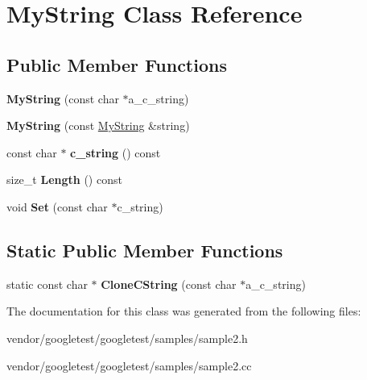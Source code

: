 \hypertarget{class_my_string}{}\section{My\+String Class Reference}
\label{class_my_string}
\subsection*{Public Member Functions}
\begin{DoxyCompactItemize}
\item 
\mbox{\label{class_my_string_a28134eb91b6698f46b12accefa157d0f}} 
{\bfseries My\+String} (const char $\ast$a\+\_\+c\+\_\+string)
\item 
\mbox{\label{class_my_string_ae24c7cf89a58dd2287303df2ac054c66}} 
{\bfseries My\+String} (const \hyperlink{class_my_string}{My\+String} \&string)
\item 
\mbox{\label{class_my_string_aff2af0cf30db39fe24a235670ee6ff25}} 
const char $\ast$ {\bfseries c\+\_\+string} () const
\item 
\mbox{\label{class_my_string_a4eb168b1ec401a732b3859abe004d648}} 
size\+\_\+t {\bfseries Length} () const
\item 
\mbox{\label{class_my_string_a521c4cd7eccac6ce554d8a51505e4970}} 
void {\bfseries Set} (const char $\ast$c\+\_\+string)
\end{DoxyCompactItemize}
\subsection*{Static Public Member Functions}
\begin{DoxyCompactItemize}
\item 
\mbox{\label{class_my_string_a40753dcfa3314a8993f32bdd75d67ce2}} 
static const char $\ast$ {\bfseries Clone\+C\+String} (const char $\ast$a\+\_\+c\+\_\+string)
\end{DoxyCompactItemize}


The documentation for this class was generated from the following files\+:\begin{DoxyCompactItemize}
\item 
vendor/googletest/googletest/samples/sample2.\+h\item 
vendor/googletest/googletest/samples/sample2.\+cc\end{DoxyCompactItemize}
